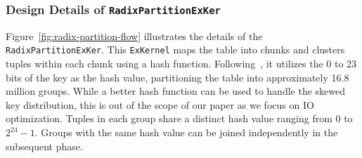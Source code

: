 \begin{comment}
Our goal is to accelerate the following query 
\begin{verbatim}
SELECT SUM(A.val + B.val) FROM A, B WHERE A.key == B.key;
\end{verbatim}
with GPU, when both tables A and B are larger than GPU memory capacity.
Clemens et el.~\cite{triton-join} proposes a faster-than-CPU solution deeply dependent on a special version of high-bandwidth CPU-GPU NVlinks.
We achieve even better results with our \texttt{Exchange} primitive and IO-decoupled programming model, which uses open standard PCIe links to access CPU-side memory. 
In this case study, we follow the problem setup as~\cite{triton-join}.
$|A| = |B|$, and each row of \texttt{A} and \texttt{B} is a tuple of 8-byte unsigned integers \texttt{<key, val>}.
\texttt{B.key} contains foreign keys to \texttt{A}, following uniform distribution.

Following the classic idea of radix-partitioned hash join~\cite{partitioned-join-vldb99}, our solution includes a \texttt{RadixPartitionExKer} to cluster tuples with identical hashes into \textit{groups} and a \texttt{HashJoinExKer} to join the \textit{groups} from both tables with the same hashes together. 
\end{comment}

\subsubsection{\textbf{Design Details of \texttt{RadixPartitionExKer}}}
Figure~\ref{fig:radix-partition-flow} illustrates the details of the \texttt{RadixPartitionExKer}. 
This \texttt{ExKernel} maps the table into chunks and clusters tuples within each chunk using a hash function. 
Following~\cite{triton-join}, it utilizes the 0 to 23 bits of the key as the hash value, partitioning the table into approximately 16.8 million groups.
While a better hash function can be used to handle the skewed key distribution, this is out of the scope of our paper as we focus on IO optimization.
Tuples in each group share a distinct hash value ranging from 0 to $2^{24} - 1$. 
Groups with the same hash value can be joined independently in the subsequent phase.

\begin{comment}
Figure~\ref{fig:radix-parition-flow} presents the details of this \texttt{ExKernel}.
At a high level, it maps the table into chunks and clusters the tuples inside each chunk based on a hash function.
Similar to~\cite{triton-join}, we take the 0 to 23 bits from the key as the hash value, which means this operation clusters the table into 16.8 million groups.
The hashes of groups start from 0 and end at $2^{24} - 1$.
The groups with the same hashes can be joined, independently from other tuples, in the join phase.
\end{comment}

